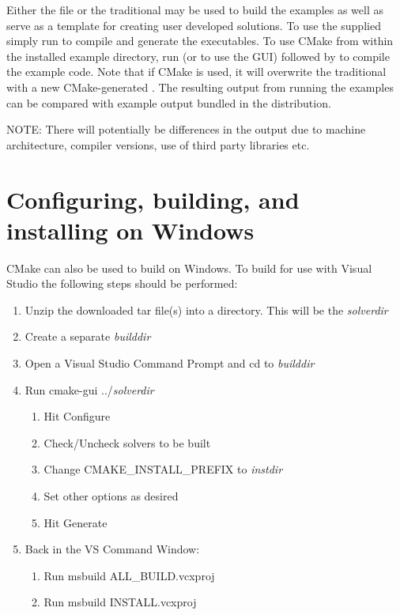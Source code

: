 Either the  file or the traditional  may be used to build the examples
as well as serve as a template for creating user developed solutions.
To use the supplied  simply run  to compile and generate the executables.
To use CMake from within the installed example directory, run  (or  to use the GUI)
followed by  to compile the example code.
Note that if CMake is used, it will overwrite the traditional  with a new CMake-generated .
The resulting output from running the examples can be compared with example output bundled
in the {\sundials} distribution.

\noindent NOTE: There will potentially be differences in the output due to machine architecture, compiler versions,
use of third party libraries etc.{\warn}


\section{Configuring, building, and installing  on Windows}\label{s:cmake_windows}
CMake can also be used to build {\sundials} on Windows. To build {\sundials} for
use with Visual Studio the following steps should be performed:
\begin{enumerate}
\item Unzip the downloaded tar file(s) into a directory. This will be the {\em solverdir}
\item Create a separate {\em builddir}
\item Open a Visual Studio Command Prompt and cd to {\em builddir}
\item Run cmake-gui ../{\em solverdir}
\begin{enumerate}
\item Hit Configure
\item Check/Uncheck solvers to be built
\item Change CMAKE\_INSTALL\_PREFIX to {\em instdir}
\item Set other options as desired
\item Hit Generate
\end{enumerate}
\item Back in the VS Command Window:
\begin{enumerate}
\item Run msbuild ALL\_BUILD.vcxproj
\item Run msbuild INSTALL.vcxproj
\end{enumerate}
\end{enumerate}

